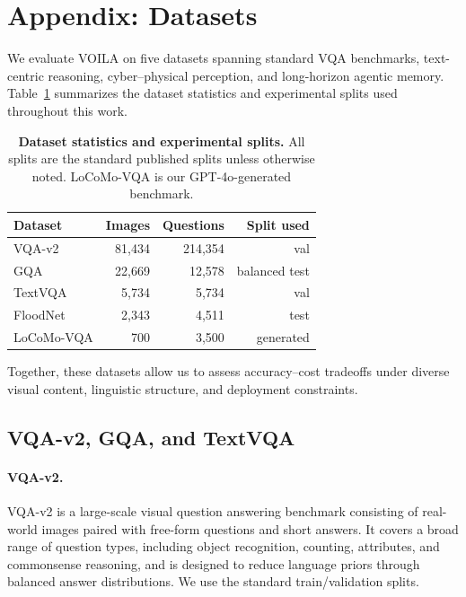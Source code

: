 \section{Appendix: Datasets}
\label{sec:datasets}

We evaluate \textsc{VOILA} on five datasets spanning standard VQA benchmarks, text-centric reasoning, cyber--physical perception, and long-horizon agentic memory.
Table~\ref{tab:dataset_stats} summarizes the dataset statistics and experimental splits used throughout this work.

\begin{table}[h]
\centering
\small
\caption{\textbf{Dataset statistics and experimental splits.} All splits are the standard published splits unless otherwise noted. LoCoMo-VQA is our GPT-4o-generated benchmark.}
\label{tab:dataset_stats}
\begin{tabular}{lrrr}
\toprule
\textbf{Dataset} & \textbf{Images} & \textbf{Questions} & \textbf{Split used} \\
\midrule
VQA-v2   & 81{,}434 & 214{,}354 & val \\
GQA      & 22{,}669 & 12{,}578  & balanced test \\
TextVQA  & 5{,}734  & 5{,}734   & val \\
FloodNet & 2{,}343  & 4{,}511   & test \\
LoCoMo-VQA & 700   & 3{,}500   & generated \\
\bottomrule
\end{tabular}
\end{table}
Together, these datasets allow us to assess accuracy--cost tradeoffs under diverse visual content, linguistic structure, and deployment constraints.

\subsection{VQA-v2, GQA, and TextVQA}
\label{sec:vqa_datasets}
\paragraph{VQA-v2.}
VQA-v2 \cite{goyal2017vqav2} is a large-scale visual question answering benchmark consisting of real-world images paired with free-form questions and short answers.
It covers a broad range of question types, including object recognition, counting, attributes, and commonsense reasoning, and is designed to reduce language priors through balanced answer distributions.
We use the standard train/validation splits.

